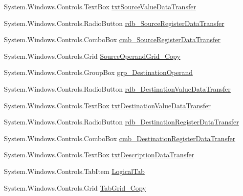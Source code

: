 \begin{DoxyCompactItemize}
\item 
System.\+Windows.\+Controls.\+Text\+Box \hyperlink{class_c_p_u___o_s___simulator_1_1_instructions_window_a44cd8a2732d939d1746051f8b2093500}{txt\+Source\+Value\+Data\+Transfer}
\item 
System.\+Windows.\+Controls.\+Radio\+Button \hyperlink{class_c_p_u___o_s___simulator_1_1_instructions_window_a0d449427537f2c5baea2e2b7e669a9d7}{rdb\+\_\+\+Source\+Register\+Data\+Transfer}
\item 
System.\+Windows.\+Controls.\+Combo\+Box \hyperlink{class_c_p_u___o_s___simulator_1_1_instructions_window_ae2136d0a711f92a681278571fbe2868b}{cmb\+\_\+\+Source\+Register\+Data\+Transfer}
\item 
System.\+Windows.\+Controls.\+Grid \hyperlink{class_c_p_u___o_s___simulator_1_1_instructions_window_a46fbe457dccbe131387644a73cc19b19}{Source\+Operand\+Grid\+\_\+\+Copy}
\item 
System.\+Windows.\+Controls.\+Group\+Box \hyperlink{class_c_p_u___o_s___simulator_1_1_instructions_window_a836175caed2a6d02d8635bb6cc3f6cae}{grp\+\_\+\+Destination\+Operand}
\item 
System.\+Windows.\+Controls.\+Radio\+Button \hyperlink{class_c_p_u___o_s___simulator_1_1_instructions_window_a03ff2485a6554464a5c6c2b012dafd1a}{rdb\+\_\+\+Destination\+Value\+Data\+Transfer}
\item 
System.\+Windows.\+Controls.\+Text\+Box \hyperlink{class_c_p_u___o_s___simulator_1_1_instructions_window_a84f7cc6d64bd8050be7c729f469cd29c}{txt\+Destination\+Value\+Data\+Transfer}
\item 
System.\+Windows.\+Controls.\+Radio\+Button \hyperlink{class_c_p_u___o_s___simulator_1_1_instructions_window_a00e9e3013355f592d97a38b29e94899c}{rdb\+\_\+\+Destination\+Register\+Data\+Transfer}
\item 
System.\+Windows.\+Controls.\+Combo\+Box \hyperlink{class_c_p_u___o_s___simulator_1_1_instructions_window_a2cf44cbfe54b2d8f024d5c06067320a1}{cmb\+\_\+\+Destination\+Register\+Data\+Transfer}
\item 
System.\+Windows.\+Controls.\+Text\+Box \hyperlink{class_c_p_u___o_s___simulator_1_1_instructions_window_a58152c12c2022edc73b39c1f95ec7ba4}{txt\+Description\+Data\+Transfer}
\item 
System.\+Windows.\+Controls.\+Tab\+Item \hyperlink{class_c_p_u___o_s___simulator_1_1_instructions_window_a06c53026f495bcbdad82e84bbcb6611c}{Logical\+Tab}
\item 
System.\+Windows.\+Controls.\+Grid \hyperlink{class_c_p_u___o_s___simulator_1_1_instructions_window_a0f8731825bc5369e0328b2b9580e9b67}{Tab\+Grid\+\_\+\+Copy}

\end{DoxyCompactItemize}
